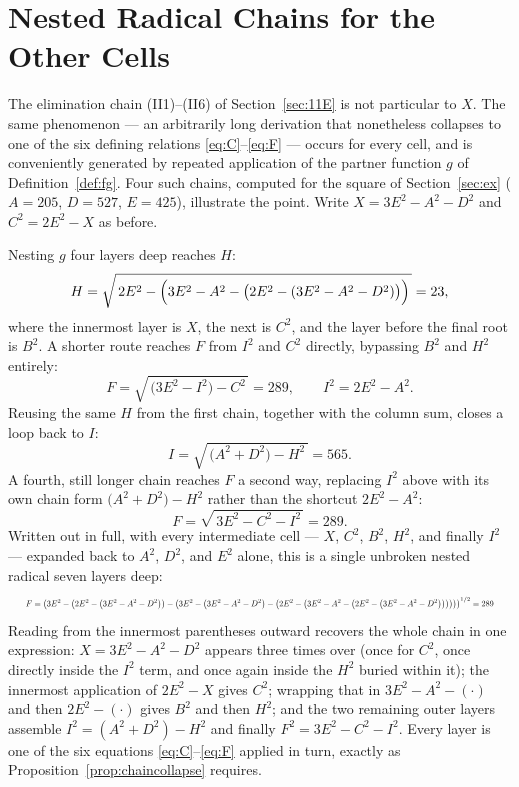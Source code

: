 \documentclass[12pt]{article}
\theoremstyle{remark}
\begin{document}
\section{Nested Radical Chains for the Other Cells}\label{sec:nestedchains}

The elimination chain (II1)--(II6) of Section~\ref{sec:11E} is not
particular to $X$. The same phenomenon --- an arbitrarily long
derivation that nonetheless collapses to one of the six defining
relations \eqref{eq:C}--\eqref{eq:F} --- occurs for every cell, and is
conveniently generated by repeated application of the partner function
$g$ of Definition~\ref{def:fg}. Four such chains, computed for the
square of Section~\ref{sec:ex} ($A=205$, $D=527$, $E=425$), illustrate
the point. Write $X=3E^2-A^2-D^2$ and $C^2=2E^2-X$ as before.

Nesting $g$ four layers deep reaches $H$:
\[
H = \sqrt{\,2E^2 - \Bigl(3E^2-A^2-\bigl(2E^2-(3E^2-A^2-D^2)\bigr)\Bigr)\,}
  = 23 ,
\]
where the innermost layer is $X$, the next is $C^2$, and the layer
before the final root is $B^2$. A shorter route reaches $F$ from $I^2$
and $C^2$ directly, bypassing $B^2$ and $H^2$ entirely:
\[
F = \sqrt{\,\bigl(3E^2-I^2\bigr) - C^2\,} = 289 , \qquad I^2=2E^2-A^2 .
\]
Reusing the same $H$ from the first chain, together with the column
sum, closes a loop back to $I$:
\[
I = \sqrt{\,\bigl(A^2+D^2\bigr) - H^2\,} = 565 .
\]
A fourth, still longer chain reaches $F$ a second way, replacing $I^2$
above with its own chain form $\bigl(A^2+D^2\bigr)-H^2$ rather than the
shortcut $2E^2-A^2$:
\[
F = \sqrt{\,3E^2 - C^2 - I^2\,} = 289 .
\]
Written out in full, with every intermediate cell --- $X$, $C^2$,
$B^2$, $H^2$, and finally $I^2$ --- expanded back to $A^2$, $D^2$, and
$E^2$ alone, this is a single unbroken nested radical seven layers
deep:
\[
\resizebox{0.97\textwidth}{!}{$\displaystyle
F = \left(3E^2 - \left(2E^2 - \left(3E^2-A^2-D^2\right)\right)
   - \left(3E^2 - \left(3E^2-A^2-D^2\right)
      - \left(2E^2 - \left(3E^2-A^2
         - \left(2E^2 - \left(3E^2-A^2-D^2\right)\right)
      \right)\right)
   \right)
\right)^{1/2} = 289
$}
\]
Reading from the innermost parentheses outward recovers the whole
chain in one expression: $X=3E^2-A^2-D^2$ appears three times over
(once for $C^2$, once directly inside the $I^2$ term, and once again
inside the $H^2$ buried within it); the innermost application of
$2E^2-X$ gives $C^2$; wrapping that in $3E^2-A^2-(\cdot)$ and then
$2E^2-(\cdot)$ gives $B^2$ and then $H^2$; and the two remaining outer
layers assemble $I^2=(A^2+D^2)-H^2$ and finally
$F^2=3E^2-C^2-I^2$. Every layer is one of the six equations
\eqref{eq:C}--\eqref{eq:F} applied in turn, exactly as
Proposition~\ref{prop:chaincollapse} requires.
\end{document}
